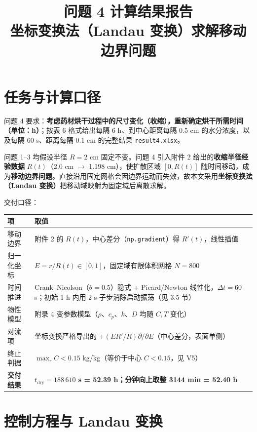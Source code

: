 \documentclass[11pt]{ctexart}
\title{\bfseries 问题 4 计算结果报告\\[0.3em]\large 坐标变换法（Landau 变换）求解移动边界问题}
\author{}
\date{}
\begin{document}
\maketitle
\vspace{-2.5em}

\section{任务与计算口径}

问题 4 要求：\textbf{考虑药材烘干过程中的尺寸变化（收缩），重新确定烘干所需时间（单位：h）}；按表 6 格式给出每隔 6 h、到中心距离每隔 0.5 cm 的水分浓度，以及每隔 60 s、距离每隔 0.1 cm 的完整结果 \texttt{result4.xlsx}。

问题 1--3 均假设半径 $R=2$ cm 固定不变。问题 4 引入附件 2 给出的\textbf{收缩半径经验数据} $R(t)$（2.0 cm $\to$ 1.198 cm），使扩散区域 $[0,R(t)]$ 随时间移动，成为\textbf{移动边界问题}。直接沿用固定网格会因边界运动而失效，故本文采用\textbf{坐标变换法（Landau 变换）}把移动域映射为固定域后离散求解。

交付口径：

\begin{center}
\begin{tabularx}{\textwidth}{lX}
\toprule
\textbf{项} & \textbf{取值} \\
\midrule
移动边界 & 附件 2 的 $R(t)$，中心差分（\texttt{np.gradient}）得 $R'(t)$，线性插值 \\
归一化坐标 & $E = r/R(t)\in[0,1]$，固定域有限体积网格 $N = 800$ \\
时间推进 & Crank--Nicolson（$\theta = 0.5$）隐式 + Picard/Newton 线性化，$\Delta t = 60$ s；初始 1 h 内用 2 s 子步消除启动振荡（见 3.5 节） \\
物性模型 & 附录 4 变参数模型（$\rho$、$c_p$、$k$、$D$ 均随 $C,T$ 变化） \\
对流项 & 坐标变换严格导出的 $+(E R'/R)\partial/\partial E$（中心差分，表面单侧） \\
终止判据 & $\max_r C < 0.15$ kg/kg（等价于中心 $C < 0.15$，见 V5） \\
\textbf{交付结果} & \textbf{$t_\text{dry} = 188\,610$ s = 52.39 h；分钟向上取整 3144 min = 52.40 h} \\
\bottomrule
\end{tabularx}
\end{center}

\section{控制方程与 Landau 变换}
\end{document}

